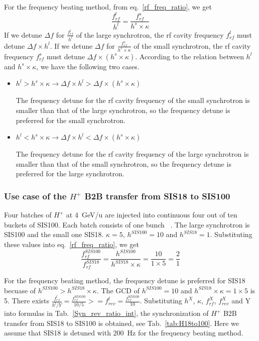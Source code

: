 For the frequency beating method, from eq.~\ref{rf_freq_ratio}, we get
\begin{equation}
\frac{f_{rf}^{l}}{h^l}= \frac{f_{rf}^{s}}{h^s \times \kappa} 
\end{equation}
If we detune $\Delta f$ for $\frac{f_{rf}^{l}}{h^l}$ of the large synchrotron, the rf cavity frequency $ f_{rf}^{l}$ must detune $\Delta f \times h^l$. If we detune $\Delta f$ for $\frac{f_{rf}^{s}}{h^s \times \kappa}$ of the small synchrotron, the rf cavity frequency $ f_{rf}^{s}$ must detune $\Delta f \times (h^s \times \kappa)$. According to the relation between $h^l$ and $h^s \times \kappa$, we have the following two cases.
\begin{itemize}
	\item $h^l > h^s \times \kappa \rightarrow \Delta f \times h^l > \Delta f \times (h^s \times \kappa)$ 

The frequency detune for the rf cavity frequency of the small synchrotron is smaller than that of the large synchrotron, so the frequency detune is preferred for the small synchrotron.
	\item $h^l < h^s \times \kappa \rightarrow \Delta f \times h^l < \Delta f \times (h^s \times \kappa)$

The frequency detune for the rf cavity frequency of the large synchrotron is smaller than that of the small synchrotron, so the frequency detune is preferred for the large synchrotron.
\end{itemize}
\subsubsection{Use case of the $H^{+}$ B2B transfer from SIS18 to SIS100}
Four batches of $H^{+}$ at \SI{4}{GeV/\atomicmassunit} are injected into continuous four out of ten buckets of SIS100. Each batch consists of one bunch ~\cite{liebermann_fair_2013, liebermann_sis100_2013}. The large synchrotron is SIS100 and the small one SIS18. $\kappa=5$, $h^{SIS100}=10$ and $h^{SIS18}=1$. Substituting these values into eq.~\ref{rf_freq_ratio}, we get
\begin{equation}
\frac{f_{rf}^{SIS100}}{f_{rf}^{SIS18}}= \frac {h^{SIS100}}{h^{SIS18} \times \kappa}= \frac{10}{1 \times 5}=\frac{2}{1}
\end{equation}

For the frequency beating method, the frequency detune is preferred for SIS18 becuase of $h^{SIS100} > h^{SIS18} \times \kappa$. The GCD of $h^{SIS100}=10$ and $h^{SIS18} \times \kappa=1\times 5$  is 5.
There exists $\frac{f_{rf}^{l}}{h^l/Y}=\frac{f_{rf}^{SIS100}}{10/5}>=f_{rev}^{l}=\frac{f_{rf}^{SIS100}}{10}$. Substituting $h^X$, $\kappa$, $f_{rf}^{X}$, $f_{rev}^{X}$ and Y into formulas in Tab.~\ref{Syn_rev_ratio_int}, the synchronization of $H^{+}$ B2B transfer from SIS18 to SIS100 is obtained, see Tab.~\ref{tab:H18to100}. Here we assume that SIS18 is detuned with \SI{200}{Hz} for the frequency beating method. 

